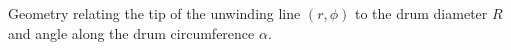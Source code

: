 \label{fig:geometry} Geometry relating the tip of the unwinding line $(r,\phi)$ to the drum diameter $R$ and angle along the drum circumference $\alpha$.